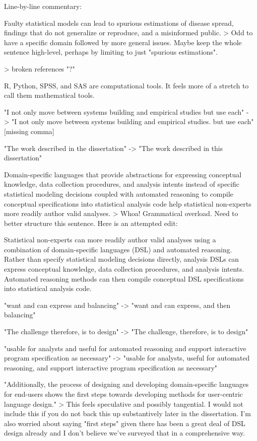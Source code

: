 
Line-by-line commentary:

Faulty statistical models can lead to spurious estimations of disease spread, findings that do not generalize or reproduce, and a misinformed public.
> Odd to have a specific domain followed by more general issues. Maybe keep the whole sentence high-level, perhaps by limiting to just "spurious estimations".

> broken references "?"

R, Python, SPSS, and SAS are computational tools. It feels more of a stretch to call them mathematical tools.

"I not only move between systems building and empirical studies but use each" ->
"I not only move between systems building and empirical studies. but use each"
[missing comma]

"The work described in the dissertation" ->
"The work described in this dissertation"

Domain-specific languages that provide abstractions for expressing conceptual knowledge, data collection procedures, and analysis intents instead of specific statistical modeling decisions coupled with automated reasoning to compile conceptual specifications into statistical analysis code help statistical non-experts more readily author valid analyses.
> Whoa! Grammatical overload. Need to better structure this sentence. Here is an attempted edit:

Statistical non-experts can more readily author valid analyses using a
combination of domain-specific languages (DSL) and automated reasoning. Rather
than specify statistical modeling decisions directly, analysis DSLs can express
conceptual knowledge, data collection procedures, and analysis intents.
Automated reasoning methods can then compile conceptual DSL specifications into
statistical analysis code.

"want and can express and balancing" ->
"want and can express, and then balancing"

"The challenge therefore, is to design" ->
"The challenge, therefore, is to design"

"usable for analysts and useful for automated reasoning and support interactive program specification as necessary" ->
"usable for analysts, useful for automated reasoning, and support interactive program specification as necessary"

"Additionally, the process of designing and developing domain-specific languages for end-users shows the first steps towards developing methods for user-centric language design."
> This feels speculative and possibly tangential. I would not include this if you do not back this up substantively later in the dissertation. I'm also worried about saying "first steps" given there has been a great deal of DSL design already and I don't believe we've surveyed that in a comprehensive way.

